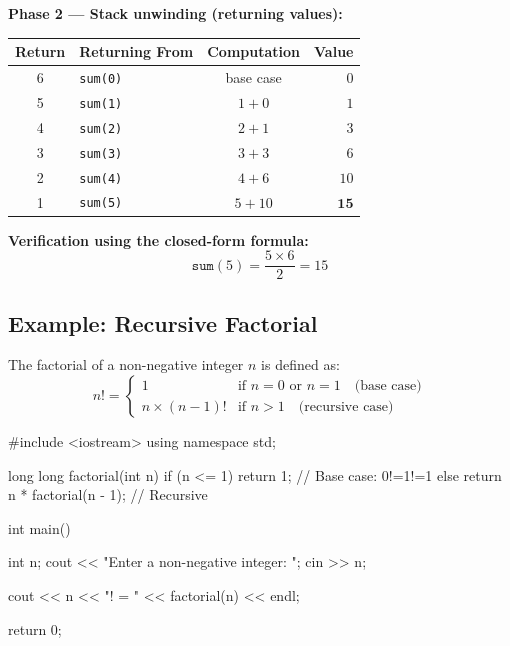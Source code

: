 \noindent\textbf{Phase 2 --- Stack unwinding (returning values):}

\begin{center}
\renewcommand{\arraystretch}{1.3}
\begin{tabular}{@{}clcr@{}}
\toprule
\textbf{Return} & \textbf{Returning From}
    & \textbf{Computation}
    & \textbf{Value} \\
\midrule
6 & \texttt{sum(0)} & base case
    & $0$ \\
5 & \texttt{sum(1)} & $1 + 0$
    & $1$ \\
4 & \texttt{sum(2)} & $2 + 1$
    & $3$ \\
3 & \texttt{sum(3)} & $3 + 3$
    & $6$ \\
2 & \texttt{sum(4)} & $4 + 6$
    & $10$ \\
1 & \texttt{sum(5)} & $5 + 10$
    & $\mathbf{15}$ \\
\bottomrule
\end{tabular}
\end{center}

\noindent\textbf{Verification using the closed-form formula:}
\[
    \texttt{sum}(5) = \frac{5 \times 6}{2} = \boxed{15}
\]

\subsection{Example: Recursive Factorial}
\label{subsec:recursive-factorial}

The factorial of a non-negative integer $n$ is defined as:
\[
    n! =
    \begin{cases}
        1 & \text{if } n = 0 \text{ or } n = 1
            \quad \text{(base case)} \\
        n \times (n-1)! & \text{if } n > 1
            \quad \text{(recursive case)}
    \end{cases}
\]

\begin{cppcode}
#include <iostream>
using namespace std;

long long factorial(int n)
{
    if (n <= 1)
        return 1;           // Base case: 0!=1!=1
    else
        return n * factorial(n - 1); // Recursive
}

int main()
{
    int n;
    cout << "Enter a non-negative integer: ";
    cin >> n;

    cout << n << "! = " << factorial(n) << endl;

    return 0;
}
\end{cppcode}

